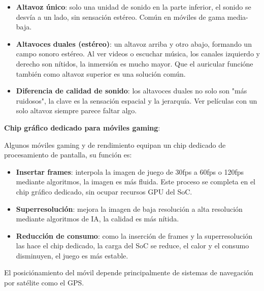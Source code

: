 \begin{itemize}
  \item \textbf{Altavoz único}: solo una unidad de sonido en la parte inferior, el sonido se desvía a un lado, sin sensación estéreo. Común en móviles de gama media-baja.
  \item \textbf{Altavoces duales (estéreo)}: un altavoz arriba y otro abajo, formando un campo sonoro estéreo. Al ver videos o escuchar música, los canales izquierdo y derecho son nítidos, la inmersión es mucho mayor. Que el auricular funcióne también como altavoz superior es una solución común.
  \item \textbf{Diferencia de calidad de sonido}: los altavoces duales no solo son "más ruidosos", la clave es la sensación espacial y la jerarquía. Ver películas con un solo altavoz siempre parece faltar algo.
\end{itemize}

\textbf{Chip gráfico dedicado para móviles gaming}:

Algunos móviles gaming y de rendimiento equipan un chip dedicado de procesamiento de pantalla, su función es:

\begin{itemize}
  \item \textbf{Insertar frames}: interpola la imagen de juego de 30fps a 60fps o 120fps mediante algoritmos, la imagen es más fluida. Este proceso se completa en el chip gráfico dedicado, sin ocupar recursos GPU del SoC.
  \item \textbf{Superresolución}: mejora la imagen de baja resolución a alta resolución mediante algoritmos de IA, la calidad es más nítida.
  \item \textbf{Reducción de consumo}: como la inserción de frames y la superresolución las hace el chip dedicado, la carga del SoC se reduce, el calor y el consumo disminuyen, el juego es más estable.
\end{itemize}


El posiciónamiento del móvil depende principalmente de sistemas de navegación por satélite como el GPS.

